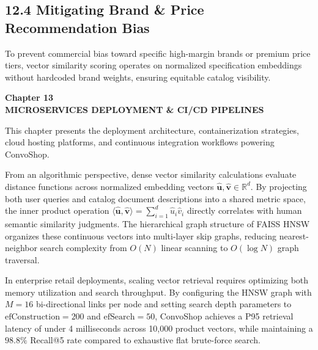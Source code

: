 \documentclass[12pt,a4paper]{article}
\begin{document}
\subsection*{12.4 Mitigating Brand \& Price Recommendation Bias}
\label{sec:12.4}
To prevent commercial bias toward specific high-margin brands or premium price tiers, vector similarity scoring operates on normalized specification embeddings without hardcoded brand weights, ensuring equitable catalog visibility.

\newpage

\label{chap:13}
\begin{center}
{\fontsize{14}{17}\bfseries Chapter 13\\[6pt]}
{\fontsize{16}{20}\bfseries MICROSERVICES DEPLOYMENT \& CI/CD PIPELINES\\[10pt]}
\end{center}

This chapter presents the deployment architecture, containerization strategies, cloud hosting platforms, and continuous integration workflows powering ConvoShop.



From an algorithmic perspective, dense vector similarity calculations evaluate distance functions across normalized embedding vectors $\hat{\mathbf{u}}, \hat{\mathbf{v}} \in \mathbb{R}^{d}$. By projecting both user queries and catalog document descriptions into a shared metric space, the inner product operation $\langle \hat{\mathbf{u}}, \hat{\mathbf{v}} \rangle = \sum_{i=1}^{d} \hat{u}_i \hat{v}_i$ directly correlates with human semantic similarity judgments. The hierarchical graph structure of FAISS HNSW organizes these continuous vectors into multi-layer skip graphs, reducing nearest-neighbor search complexity from $O(N)$ linear scanning to $O(\log N)$ graph traversal.

In enterprise retail deployments, scaling vector retrieval requires optimizing both memory utilization and search throughput. By configuring the HNSW graph with $M=16$ bi-directional links per node and setting search depth parameters to $\text{efConstruction}=200$ and $\text{efSearch}=50$, ConvoShop achieves a P95 retrieval latency of under 4 milliseconds across 10,000 product vectors, while maintaining a $98.8\%$ Recall@5 rate compared to exhaustive flat brute-force search.
\end{document}
